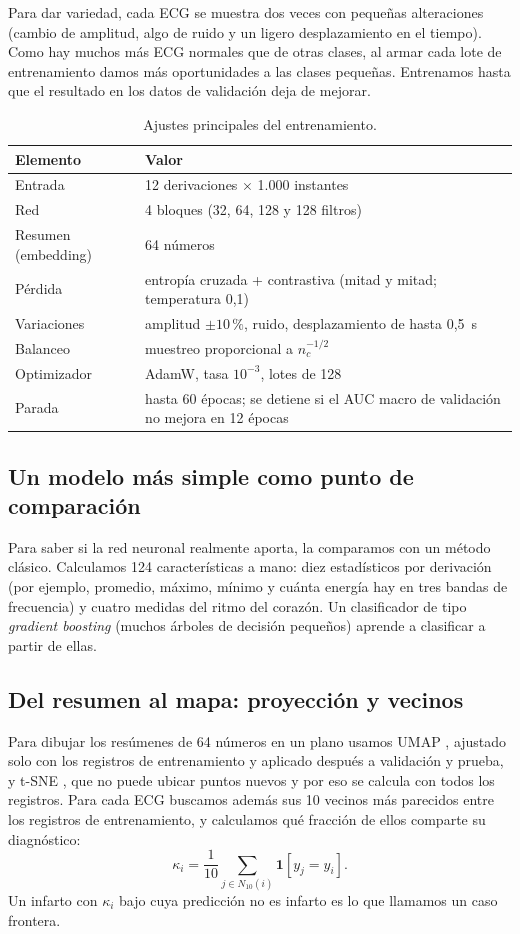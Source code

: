 \documentclass[conference]{IEEEtran}
\begin{document}
Para dar variedad, cada ECG se muestra dos veces con pequeñas alteraciones (cambio de amplitud, algo de ruido y un ligero desplazamiento en el tiempo). Como hay muchos más ECG normales que de otras clases, al armar cada lote de entrenamiento damos más oportunidades a las clases pequeñas. Entrenamos hasta que el resultado en los datos de validación deja de mejorar.

\begin{table}[t]
\centering
\caption{Ajustes principales del entrenamiento.}
\label{tab:config}
\small
\renewcommand{\arraystretch}{1.1}
\begin{tabular}{L{2.6cm} L{5.5cm}}
\toprule
Elemento & Valor \\
\midrule
Entrada & 12 derivaciones $\times$ 1.000 instantes \\
Red & 4 bloques (32, 64, 128 y 128 filtros) \\
Resumen (embedding) & 64 números \\
Pérdida & entropía cruzada + contrastiva (mitad y mitad; temperatura 0,1) \\
Variaciones & amplitud $\pm10\,\%$, ruido, desplazamiento de hasta 0,5~s \\
Balanceo & muestreo proporcional a $n_c^{-1/2}$ \\
Optimizador & AdamW, tasa $10^{-3}$, lotes de 128 \\
Parada & hasta 60 épocas; se detiene si el AUC macro de validación no mejora en 12 épocas \\
\bottomrule
\end{tabular}
\end{table}

\subsection{Un modelo más simple como punto de comparación}
Para saber si la red neuronal realmente aporta, la comparamos con un método clásico. Calculamos 124 características a mano: diez estadísticos por derivación (por ejemplo, promedio, máximo, mínimo y cuánta energía hay en tres bandas de frecuencia) y cuatro medidas del ritmo del corazón. Un clasificador de tipo \emph{gradient boosting} (muchos árboles de decisión pequeños) aprende a clasificar a partir de ellas.

\subsection{Del resumen al mapa: proyección y vecinos}
Para dibujar los resúmenes de 64 números en un plano usamos UMAP \cite{mcinnes}, ajustado solo con los registros de entrenamiento y aplicado después a validación y prueba, y t-SNE \cite{vandermaaten}, que no puede ubicar puntos nuevos y por eso se calcula con todos los registros. Para cada ECG buscamos además sus 10 vecinos más parecidos entre los registros de entrenamiento, y calculamos qué fracción de ellos comparte su diagnóstico:
\begin{equation}
\kappa_i=\frac{1}{10}\sum_{j\in N_{10}(i)}\mathbf{1}[y_j=y_i].
\label{eq:acuerdo}
\end{equation}
Un infarto con $\kappa_i$ bajo cuya predicción no es infarto es lo que llamamos un caso frontera.
\end{document}
